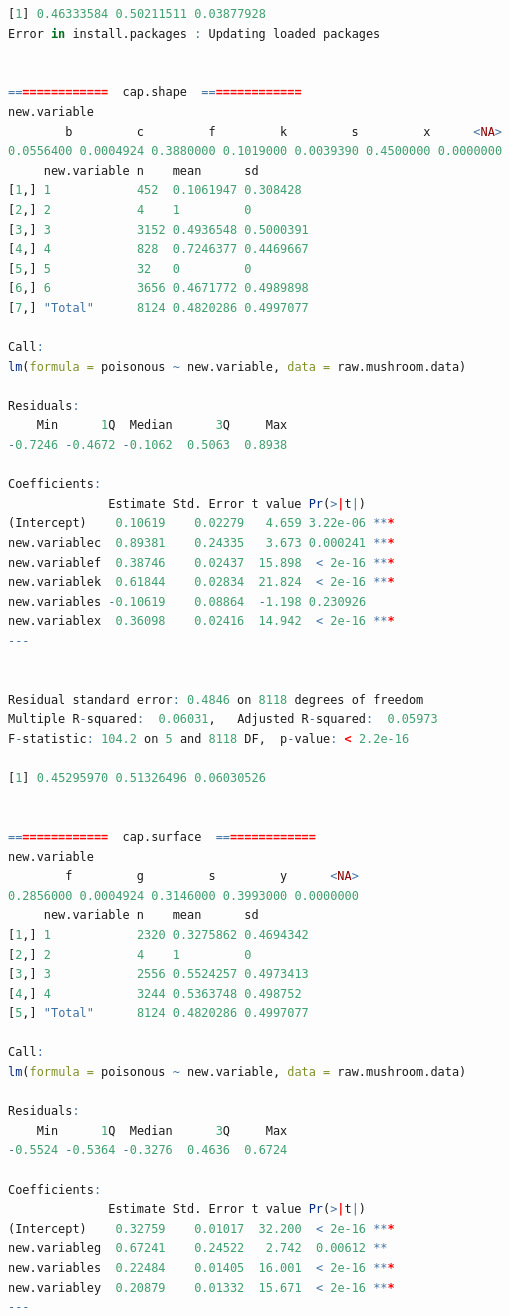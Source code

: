 \documentclass[12pt]{article}
\begin{document}
\begin{lstlisting}[language = R]
[1] 0.46333584 0.50211511 0.03877928
Error in install.packages : Updating loaded packages


==============  cap.shape  ==============
new.variable
        b         c         f         k         s         x      <NA> 
0.0556400 0.0004924 0.3880000 0.1019000 0.0039390 0.4500000 0.0000000 
     new.variable n    mean      sd       
[1,] 1            452  0.1061947 0.308428 
[2,] 2            4    1         0        
[3,] 3            3152 0.4936548 0.5000391
[4,] 4            828  0.7246377 0.4469667
[5,] 5            32   0         0        
[6,] 6            3656 0.4671772 0.4989898
[7,] "Total"      8124 0.4820286 0.4997077

Call:
lm(formula = poisonous ~ new.variable, data = raw.mushroom.data)

Residuals:
    Min      1Q  Median      3Q     Max 
-0.7246 -0.4672 -0.1062  0.5063  0.8938 

Coefficients:
              Estimate Std. Error t value Pr(>|t|)    
(Intercept)    0.10619    0.02279   4.659 3.22e-06 ***
new.variablec  0.89381    0.24335   3.673 0.000241 ***
new.variablef  0.38746    0.02437  15.898  < 2e-16 ***
new.variablek  0.61844    0.02834  21.824  < 2e-16 ***
new.variables -0.10619    0.08864  -1.198 0.230926    
new.variablex  0.36098    0.02416  14.942  < 2e-16 ***
---


Residual standard error: 0.4846 on 8118 degrees of freedom
Multiple R-squared:  0.06031,	Adjusted R-squared:  0.05973 
F-statistic: 104.2 on 5 and 8118 DF,  p-value: < 2.2e-16

[1] 0.45295970 0.51326496 0.06030526


==============  cap.surface  ==============
new.variable
        f         g         s         y      <NA> 
0.2856000 0.0004924 0.3146000 0.3993000 0.0000000 
     new.variable n    mean      sd       
[1,] 1            2320 0.3275862 0.4694342
[2,] 2            4    1         0        
[3,] 3            2556 0.5524257 0.4973413
[4,] 4            3244 0.5363748 0.498752 
[5,] "Total"      8124 0.4820286 0.4997077

Call:
lm(formula = poisonous ~ new.variable, data = raw.mushroom.data)

Residuals:
    Min      1Q  Median      3Q     Max 
-0.5524 -0.5364 -0.3276  0.4636  0.6724 

Coefficients:
              Estimate Std. Error t value Pr(>|t|)    
(Intercept)    0.32759    0.01017  32.200  < 2e-16 ***
new.variableg  0.67241    0.24522   2.742  0.00612 ** 
new.variables  0.22484    0.01405  16.001  < 2e-16 ***
new.variabley  0.20879    0.01332  15.671  < 2e-16 ***
---



\end{lstlisting}
\end{document}
